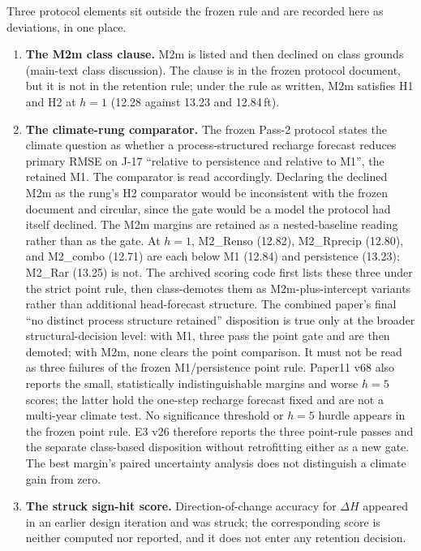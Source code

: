 \documentclass[11pt]{article}
\begin{document}
Three protocol elements sit outside the frozen rule and are recorded here as deviations, in one place.
\begin{enumerate}[leftmargin=2em]
\item \textbf{The M2m class clause.} M2m is listed and then declined on class grounds (main-text class discussion). The clause is in the frozen protocol document, but it is not in the retention rule; under the rule as written, M2m satisfies H1 and H2 at $h=1$ (12.28 against 13.23 and 12.84\,ft).
\item \textbf{The climate-rung comparator.} The frozen Pass-2 protocol states the climate question as whether a process-structured recharge forecast reduces primary RMSE on J-17 ``relative to persistence and relative to M1'', the retained M1. The comparator is read accordingly. Declaring the declined M2m as the rung's H2 comparator would be inconsistent with the frozen document and circular, since the gate would be a model the protocol had itself declined. The M2m margins are retained as a nested-baseline reading rather than as the gate. At $h=1$, M2\_Renso (12.82), M2\_Rprecip (12.80), and M2\_combo (12.71) are each below M1 (12.84) and persistence (13.23); M2\_Rar (13.25) is not. The archived scoring code first lists these three under the strict point rule, then class-demotes them as M2m-plus-intercept variants rather than additional head-forecast structure. The combined paper's final ``no distinct process structure retained'' disposition is true only at the broader structural-decision level: with M1, three pass the point gate and are then demoted; with M2m, none clears the point comparison. It must not be read as three failures of the frozen M1/persistence point rule. Paper11 v68 also reports the small, statistically indistinguishable margins and worse $h=5$ scores; the latter hold the one-step recharge forecast fixed and are not a multi-year climate test. No significance threshold or $h=5$ hurdle appears in the frozen point rule. E3 v26 therefore reports the three point-rule passes and the separate class-based disposition without retrofitting either as a new gate. The best margin's paired uncertainty analysis does not distinguish a climate gain from zero.
\item \textbf{The struck sign-hit score.} Direction-of-change accuracy for $\Delta H$ appeared in an earlier design iteration and was struck; the corresponding score is neither computed nor reported, and it does not enter any retention decision.
\end{enumerate}
\end{document}
